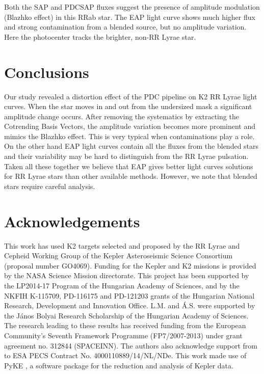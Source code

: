 \documentclass[epj,twocolumn]{webofc}
\begin{document}
Both the SAP and PDCSAP fluxes suggest the presence of amplitude modulation (Blazhko effect) in this RRab star. The EAP light curve shows much higher flux and strong contamination from a blended source, but no amplitude variation. Here the photocenter tracks the brighter, non-RR Lyrae star.  



\section{Conclusions}

Our study revealed a distortion effect of the PDC pipeline on K2 RR Lyrae light curves. When the star moves in and out from the undersized mask a significant amplitude change occurs. After removing the systematics by extracting the Cotrending Basis Vectors, the amplitude variation becomes more prominent and mimics the Blazhko effect. This is very typical when contaminations play a role. On the other hand EAP light curves contain all the fluxes from the blended stars and their variability may be hard to distinguish from the RR Lyrae pulsation. Taken all these together we believe that EAP gives better light curves solutions for RR Lyrae stars than other available methods. However, we note that blended stars require careful analysis.
\label{sec-con}

\section*{Acknowledgements}
\label{sec-ack}
This work has used K2 targets selected and proposed by the RR Lyrae and Cepheid Working Group of the Kepler Asteroseismic Science Consortium (proposal number GO4069). Funding for the Kepler and K2 missions is provided by the NASA Science Mission directorate. This project has been supported by the LP2014-17 Program of the Hungarian Academy of Sciences, and by the NKFIH K-115709, PD-116175 and PD-121203 grants of the Hungarian National Research, Development and Innovation Office. L.M. and \'A.S. were supported by the János Bolyai Research Scholarship of the Hungarian Academy of Sciences. The research leading to these results has received funding from the European Community's Seventh Framework Programme (FP7/2007-2013) under grant agreement no. 312844 (SPACEINN). The authors also acknowledge support from to ESA PECS Contract No. 4000110889/14/NL/NDe. This work made use of PyKE \cite{still}, a software package for the reduction and analysis of Kepler data. 
\end{document}
